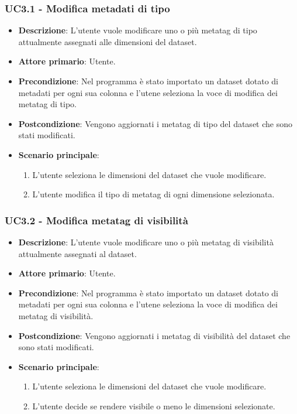\subsubsection{UC3.1 - Modifica metadati di tipo}
\label{subsubsec:uc3.1}

\begin{itemize}
    \item \textbf{Descrizione}: L’utente vuole modificare uno o più metatag di tipo attualmente assegnati alle dimensioni del dataset.
	
    \item \textbf{Attore primario}: Utente.
    
    \item \textbf{Precondizione}:   Nel programma è stato importato un dataset dotato di metadati per 
                                    ogni sua colonna e l'utene seleziona la voce di modifica dei metatag di tipo.
    \item \textbf{Postcondizione}:  Vengono aggiornati i metatag di tipo del dataset che sono stati modificati.

	\item \textbf{Scenario principale}:
		\begin{enumerate}
            \item L'utente seleziona le dimensioni del dataset che vuole modificare.
            \item L'utente modifica il tipo di metatag di ogni dimensione selezionata.
        \end{enumerate}
\end{itemize}


\subsubsection{UC3.2 - Modifica metatag di visibilità}
\label{subsubsec:uc3.2}

\begin{itemize}
    \item \textbf{Descrizione}: L’utente vuole modificare uno o più metatag di visibilità attualmente assegnati al dataset.
	
    \item \textbf{Attore primario}: Utente.
    
    \item \textbf{Precondizione}:   Nel programma è stato importato un dataset dotato di metadati per 
                                    ogni sua colonna e l'utene seleziona la voce di modifica dei metatag di visibilità.
    \item \textbf{Postcondizione}:  Vengono aggiornati i metatag di visibilità del dataset che sono stati modificati.

	\item \textbf{Scenario principale}:
		\begin{enumerate}
            \item L'utente seleziona le dimensioni del dataset che vuole modificare.
            \item L'utente decide se rendere visibile o meno le dimensioni selezionate.
        \end{enumerate}
\end{itemize}

